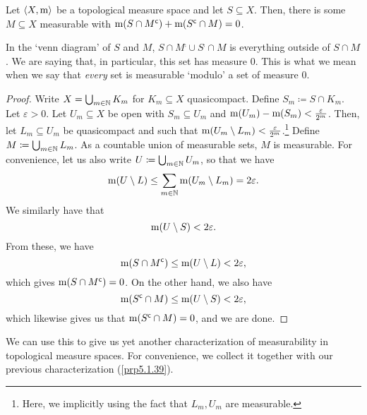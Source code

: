 \begin{prp}\label{ModuloZero}
Let $\langle X,\mathrm{m}\rangle$ be a topological measure space and let $S\subseteq X$.  Then, there is some $M\subseteq X$ measurable with $\mathrm{m} (S\cap M^{\mathsf{c}})+\mathrm{m} (S^{\mathsf{c}}\cap M)=0$.
\begin{rmk}
In the `venn diagram' of $S$ and $M$, $S\cap M^{\comp}\cup S^{\comp}\cap M$ is everything outside of $S\cap M$.  We are saying that, in particular, this set has measure $0$.  This is what we mean when we say that \emph{every} set is measurable `modulo' a set of measure $0$.
\end{rmk}
\begin{proof}
Write $X=\bigcup _{m\in \mathbb{N}}K_m$ for $K_m\subseteq X$ quasicompact.  Define $S_m\coloneqq S\cap K_m$.  Let $\varepsilon >0$.  Let $U_m\subseteq X$ be open with $S_m\subseteq U_m$ and $\mathrm{m} (U_m)-\mathrm{m} (S_m)<\frac{\varepsilon}{2^m}$.  Then, let $L_m\subseteq U_m$ be quasicompact and such that $\mathrm{m} (U_m\setminus L_m)<\frac{\varepsilon}{2^m}$.\footnote{Here, we implicitly using the fact that $L_m,U_m$ are measurable.}  Define $M\coloneqq \bigcup _{m\in \mathbb{N}}L_m$.  As a countable union of measurable sets, $M$ is measurable.  For convenience, let us also write $U\coloneqq \bigcup _{m\in \mathbb{N}}U_m$, so that we have
\begin{equation}
\mathrm{m} (U\setminus L)\leq \sum _{m\in \mathbb{N}}\mathrm{m} (U_m\setminus L_m)=2\varepsilon .
\end{equation}
We similarly have that
\begin{equation}
\mathrm{m} (U\setminus S)<2\varepsilon .
\end{equation}
From these, we have
\begin{equation}
\mathrm{m} (S\cap M^{\mathsf{c}})\leq \mathrm{m} (U\setminus L)<2\varepsilon ,
\end{equation}
which gives $\mathrm{m} (S\cap M^{\mathsf{c}})=0$.  On the other hand, we also have
\begin{equation}
\mathrm{m} (S^{\mathsf{c}}\cap M)\leq \mathrm{m} (U\setminus S)<2\varepsilon ,
\end{equation}
which likewise gives us that $\mathrm{m} (S^{\mathsf{c}}\cap M)=0$, and we are done.
\end{proof}
\end{prp}
We can use this to give us yet another characterization of measurability in topological measure spaces.  For convenience, we collect it together with our previous characterization (\cref{prp5.1.39}).
